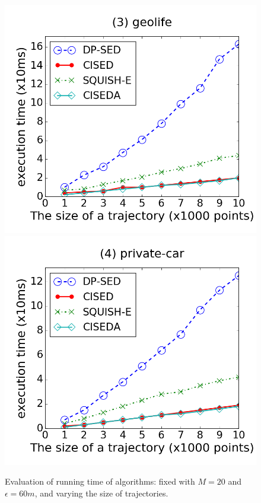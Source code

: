 \begin{figure}[tb!]
\includegraphics[scale = 0.245]{figures/Exp-time-size-geolife.png}
\includegraphics[scale = 0.245]{figures/Exp-time-size-private.png}
\vspace{-3ex}
\caption{\small Evaluation of running time of \lsa algorithms: fixed with $M=20$ and $\epsilon=60m$, and varying the size of trajectories.}
\label{fig:time-size}
\vspace{-2ex}
\end{figure}





